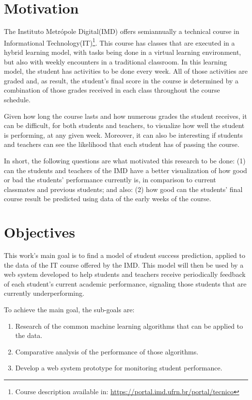 \section{Motivation}

The Instituto Metrópole Digital(IMD) offers semiannually a technical course in Informational Technology(IT)\footnote[1]{\hspace{1mm}Course description available in: \url{https://portal.imd.ufrn.br/portal/tecnico}}. This course has classes that are executed in a hybrid learning model, with tasks being done in a virtual learning environment, but also with weekly encounters in a traditional classroom. In this learning model, the student has activities to be done every week. All of those activities are graded and, as result, the student's final score in the course is determined by a combination of those grades received in each class throughout the course schedule.

Given how long the course lasts and how numerous grades the student receives, it can be difficult, for both students and teachers, to visualize how well the student is performing, at any given week. Moreover, it can also be interesting if students and teachers can see the likelihood that each student has of passing the course.

In short, the following questions are what motivated this research to be done: (1) can the students and teachers of the IMD have a better visualization of how good or bad the students' performance currently is, in comparison to current classmates and previous students; and also: (2) how good can the students' final course result be predicted using data of the early weeks of the course.

\section{Objectives}

This work's main goal is to find a model of student success prediction, applied to the data of the IT course offered by the IMD. This model will then be used by a web system developed to help students and teachers receive periodically feedback of each student's current academic performance, signaling those students that are currently underperforming.

To achieve the main goal, the sub-goals are:

\begin{enumerate}
    \item Research of the common machine learning algorithms that can be applied to the data.
    \item Comparative analysis of the performance of those algorithms.
    \item Develop a web system prototype for monitoring student performance.
\end{enumerate}

